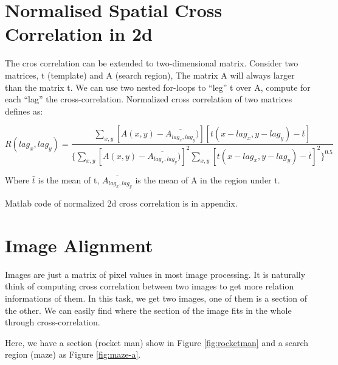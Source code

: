 \section{Normalised Spatial Cross Correlation in 2d}

The cros correlation can be extended to two-dimensional matrix. Consider two matrices, t (template) and A (search region), The matrix A will always larger than the matrix t. We can use two nested for-loops to ``leg'' t over A, compute for each ``lag'' the cross-correlation. Normalized cross correlation of two matrices defines as:

\begin{equation*}
R(lag_{x},lag_{y})=
\frac{\sum_{x,y}[A(x,y)-\overline{A_{lag_{x},lag_{y}}})][t(x-lag_{x},y-lag_{y})-\bar{t}]}
{\{\sum_{x,y}[A(x,y)-\overline{A_{lag_{x},lag_{y}}})]^2
	\sum_{x,y}[t(x-lag_{x},y-lag_{y})-\bar{t}]^2
	\}^{0.5}}
\end{equation*}

Where $\bar{t}$ is the mean of t, $\overline{A_{lag_{x},lag_{y}}}$ is the mean of A in the region under t. 

Matlab code of normalized 2d cross correlation is in appendix.

\section{Image Alignment}

Images are just a matrix of pixel values in most image processing. It is naturally think of computing cross correlation between two images to get more relation informations of them. In this task, we get two images, one of them is a section of the other. We can easily find where the section of the image fits in the whole through cross-correlation.

Here, we have a section (rocket man) show in Figure \ref{fig:rocketman} and a search region (maze) as Figure \ref{fig:maze-a}.

